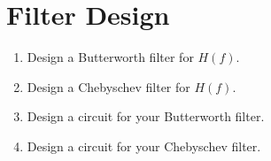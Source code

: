 \documentclass[journal,12pt,twocolumn]{IEEEtran}
\numberwithin{equation}{section}
\renewcommand\thesection{\arabic{section}}
\begin{document}
\section{Filter Design}
\begin{enumerate}[label=\thesection.\arabic*
,ref=\thesection.\theenumi]
\item Design a Butterworth filter for $H(f)$.
\item Design a Chebyschev filter for $H(f)$.
\item Design a circuit for your Butterworth filter.
\item Design a circuit for your Chebyschev filter.
\end{enumerate}
    
\end{document}
